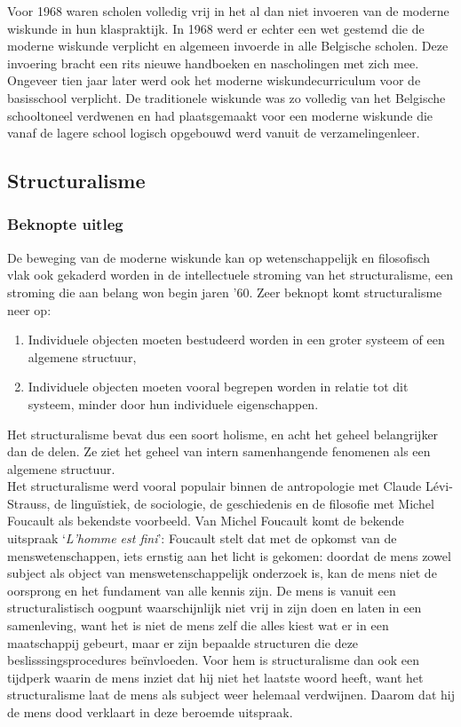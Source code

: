 \documentclass[a4paper,11pt]{article}
\begin{document}
\noindent Voor 1968 waren scholen volledig vrij in het al dan niet invoeren van 
de moderne wiskunde in hun klaspraktijk. In 1968 werd er echter een wet gestemd 
die de moderne wiskunde verplicht en algemeen invoerde in alle Belgische 
scholen. Deze invoering bracht een rits nieuwe handboeken en nascholingen met 
zich mee. Ongeveer tien jaar later werd ook het moderne wiskundecurriculum voor 
de basisschool verplicht. De traditionele wiskunde was zo volledig van het 
Belgische schooltoneel verdwenen en had plaatsgemaakt voor een moderne wiskunde 
die vanaf de lagere school logisch opgebouwd werd vanuit de verzamelingenleer.

\subsection{Structuralisme}
\subsubsection{Beknopte uitleg}
De beweging van de moderne wiskunde kan op wetenschappelijk en filosofisch vlak 
ook gekaderd worden in de intellectuele stroming van het structuralisme, een stroming die aan 
belang won begin jaren '60. Zeer beknopt komt structuralisme neer op:
\begin{enumerate}
  \item Individuele objecten moeten bestudeerd worden in een groter systeem of 
  een algemene structuur,
  \item Individuele objecten moeten vooral begrepen worden in relatie tot dit systeem, 
  minder door hun individuele eigenschappen.
\end{enumerate}
Het structuralisme bevat dus een soort holisme, en acht het geheel belangrijker dan de delen.
Ze ziet het geheel van intern samenhangende fenomenen als een algemene structuur. 
\\

\noindent Het structuralisme werd vooral populair binnen de antropologie met 
Claude Lévi-Strauss, de linguïstiek,  de sociologie, de geschiedenis en de 
filosofie met Michel Foucault als bekendste voorbeeld. Van Michel Foucault komt 
de bekende uitspraak `\textit{L'homme est fini}': Foucault stelt dat met de 
opkomst van de menswetenschappen, iets ernstig aan het licht is gekomen: doordat 
de mens zowel subject als object van menswetenschappelijk onderzoek is, kan de 
mens niet de oorsprong en het fundament van alle kennis zijn. De mens is vanuit een structuralistisch oogpunt waarschijnlijk niet 
vrij in zijn doen en laten in een samenleving, want het is niet de mens zelf die alles kiest wat er in een maatschappij gebeurt, maar er zijn bepaalde
structuren die deze beslisssingsprocedures beïnvloeden. Voor hem is 
structuralisme dan ook een tijdperk waarin de mens inziet dat hij niet het 
laatste woord heeft, want het structuralisme laat de mens als subject weer 
helemaal verdwijnen. Daarom dat hij de mens dood verklaart in deze beroemde 
uitspraak.
\end{document}
